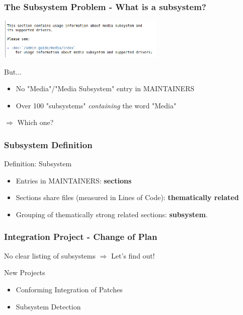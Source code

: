 \documentclass[12pt]{beamer}
\begin{document}
	\begin{frame}
	\frametitle{The Subsystem Problem - What is a subsystem?}
	\begin{center}
     	\includegraphics[width=0.6\textwidth]{pics/Media_subsystem.png}
	\end{center}

	\begin{block}{But... }
		\begin{itemize}
		\item No "Media"/"Media Subsystem" entry in MAINTAINERS
		\item Over 100 "subsystems" \textit{containing} the word "Media"
		\end{itemize}
	\end{block}
	\begin{center}
	$\Rightarrow$ Which one?
	\end{center}
	\end{frame}

	\begin{frame} 
	\frametitle{Subsystem Definition}
		\begin{block}{Definition: Subsystem}
			\begin{itemize}
				\item Entries in MAINTAINERS: \textbf{sections}
				\item Sections share files (measured in Lines of Code): \textbf{thematically related}
				\item Grouping of thematically strong related sections: \textbf{subsystem}.
			\end{itemize}

		\end{block}
	\end{frame}

	\begin{frame}
	\frametitle{Integration Project - Change of Plan}
		\begin{block}{No clear listing of subsystems}
			$\Rightarrow$ Let's find out!
		\end{block}



		\begin{block}{New Projects}
			\begin{itemize}
				\item Conforming Integration of Patches
				\item Subsystem Detection
			\end{itemize}
		\end{block}
	\end{frame}
\end{document}
